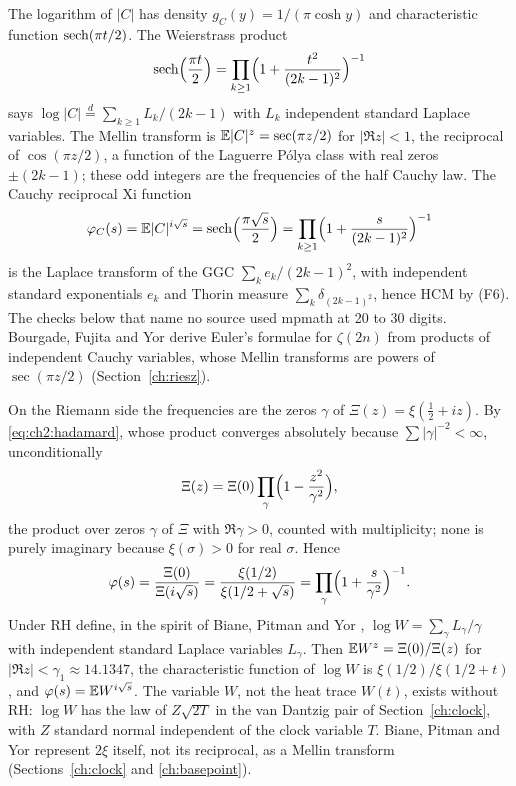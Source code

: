 The logarithm of $|C|$ has density $g_C(y)=1/(\pi\cosh y)$ and characteristic function $\operatorname{sech}(\pi t/2)$. The Weierstrass product
\[
\operatorname{sech}\Bigl(\frac{\pi t}{2}\Bigr)=\prod_{k\ge1}\Bigl(1+\frac{t^2}{(2k-1)^2}\Bigr)^{-1}
\]
says $\log|C|\stackrel{d}{=}\sum_{k\ge1}L_k/(2k-1)$ with $L_k$ independent standard Laplace variables. The Mellin transform is $\mathbb{E}|C|^z=\sec(\pi z/2)$ for $|\Re z|<1$, the reciprocal of $\cos(\pi z/2)$, a function of the Laguerre P\'olya class with real zeros $\pm(2k-1)$; these odd integers are the frequencies of the half Cauchy law. The Cauchy reciprocal Xi function
\[
\varphi_C(s)=\mathbb{E}|C|^{i\sqrt{s}}=\operatorname{sech}\Bigl(\frac{\pi\sqrt{s}}{2}\Bigr)=\prod_{k\ge1}\Bigl(1+\frac{s}{(2k-1)^2}\Bigr)^{-1}
\]
is the Laplace transform of the GGC $\sum_ke_k/(2k-1)^2$, with independent standard exponentials $e_k$ and Thorin measure $\sum_k\delta_{(2k-1)^2}$, hence HCM by (F6). The checks below that name no source used mpmath \cite{mpmath} at 20 to 30 digits. Bourgade, Fujita and Yor \cite{boBFY} derive Euler's formulae for $\zeta(2n)$ from products of independent Cauchy variables, whose Mellin transforms are powers of $\sec(\pi z/2)$ (Section~\ref{ch:riesz}).

On the Riemann side the frequencies are the zeros $\gamma$ of $\Xi(z)=\xi(\frac12+iz)$. By \eqref{eq:ch2:hadamard}, whose product converges absolutely because $\sum|\gamma|^{-2}<\infty$, unconditionally
\[
\Xi(z)=\Xi(0)\prod_{\gamma}\Bigl(1-\frac{z^2}{\gamma^2}\Bigr),
\]
the product over zeros $\gamma$ of $\Xi$ with $\Re\gamma>0$, counted with multiplicity; none is purely imaginary because $\xi(\sigma)>0$ for real $\sigma$. Hence
\[
\varphi(s)=\frac{\Xi(0)}{\Xi(i\sqrt{s})}=\frac{\xi(1/2)}{\xi(1/2+\sqrt{s})}=\prod_\gamma\Bigl(1+\frac{s}{\gamma^2}\Bigr)^{-1}.
\]
Under RH define, in the spirit of Biane, Pitman and Yor \cite{BPY01}, $\log W=\sum_\gamma L_\gamma/\gamma$ with independent standard Laplace variables $L_\gamma$. Then $\mathbb{E} W^z=\Xi(0)/\Xi(z)$ for $|\Re z|<\gamma_1\approx14.1347$, the characteristic function of $\log W$ is $\xi(1/2)/\xi(1/2+t)$, and $\varphi(s)=\mathbb{E} W^{i\sqrt{s}}$. The variable $W$, not the heat trace $W(t)$, exists without RH: $\log W$ has the law of $Z\sqrt{2T}$ in the van Dantzig pair of Section~\ref{ch:clock}, with $Z$ standard normal independent of the clock variable $T$. Biane, Pitman and Yor represent $2\xi$ itself, not its reciprocal, as a Mellin transform (Sections~\ref{ch:clock} and \ref{ch:basepoint}).


